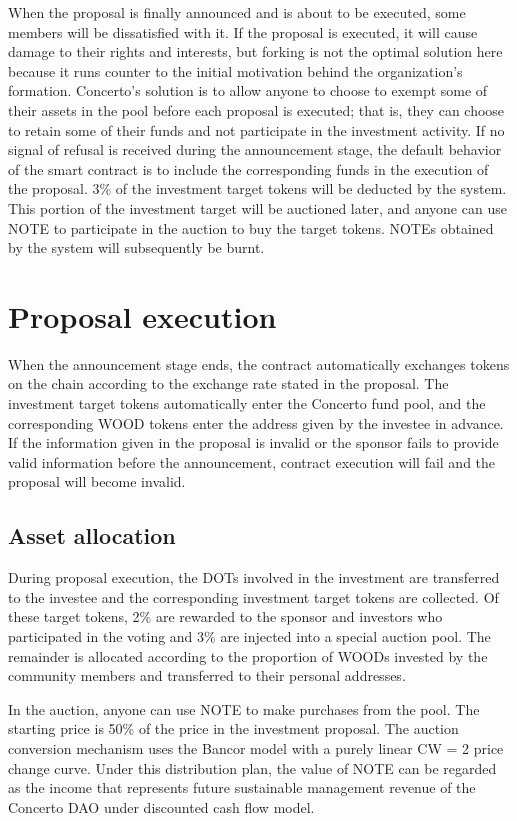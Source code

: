 \documentclass[UTF8]{article}
\begin{document}
\begin{multicols}{2}
When the proposal is finally announced and is about to be executed, some members will be dissatisfied with it. If the proposal is executed, it will cause damage to their rights and interests, but forking is not the optimal solution here because it runs counter to the initial motivation behind the organization’s formation. Concerto’s solution is to allow anyone to choose to exempt some of their assets in the pool before each proposal is executed; that is, they can choose to retain some of their funds and not participate in the investment activity. If no signal of refusal is received during the announcement stage, the default behavior of the smart contract is to include the corresponding funds in the execution of the proposal. 3\% of the investment target tokens will be deducted by the system. This portion of the investment target will be auctioned later, and anyone can use NOTE to participate in the auction to buy the target tokens. NOTEs obtained by the system will subsequently be burnt.

\section{Proposal execution}

When the announcement stage ends, the contract automatically exchanges tokens on the chain according to the exchange rate stated in the proposal. The investment target tokens automatically enter the Concerto fund pool, and the corresponding WOOD tokens enter the address given by the investee in advance. If the information given in the proposal is invalid or the sponsor fails to provide valid information before the announcement, contract execution will fail and the proposal will become invalid.

\subsection{Asset allocation}

During proposal execution, the DOTs involved in the investment are transferred to the investee and the corresponding investment target tokens are collected. Of these target tokens, 2\% are rewarded to the sponsor and investors who participated in the voting and 3\% are injected into a special auction pool. The remainder is allocated according to the proportion of WOODs invested by the community members and transferred to their personal addresses.

In the auction, anyone can use NOTE to make purchases from the pool. The starting price is 50\% of the price in the investment proposal. The auction conversion mechanism uses the Bancor model with a purely linear CW = 2 price change curve. Under this distribution plan, the value of NOTE can be regarded as the income that represents future sustainable management revenue of the Concerto DAO under discounted cash flow model.


\end{multicols}
\end{document}
